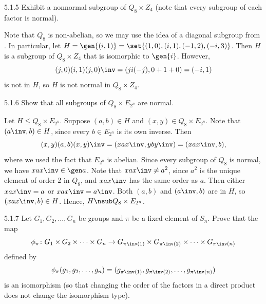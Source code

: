 \begin{exercise}{5.1.5}
    Exhibit a nonnormal subgroup of $Q_8 \times Z_4$ (note that every subgroup of each factor is normal).
\end{exercise}

\begin{sol}
    Note that $Q_8$ is non-abelian, so we may use the idea of a diagonal subgroup from .
	In particular, let $H = \gen{(i, 1)} = \set{(1, 0), (i, 1), (-1, 2), (-i, 3)}$.
	Then $H$ is a subgroup of $Q_8 \times Z_4$ that is isomorphic to $\gen{i}$.
	However,
    \[
    	(j, 0)(i, 1)(j, 0)\inv = (ji(-j), 0 + 1 + 0) = (-i, 1)
    \]
    is not in $H$, so $H$ is not normal in $Q_8 \times Z_4$.
\end{sol}

\begin{exercise}{5.1.6}
    Show that all subgroups of $Q_8 \times E_{2^n}$ are normal.
\end{exercise}

\begin{sol}
    Let $H \leq Q_8 \times E_{2^n}$.
	Suppose $(a, b) \in H$ and $(x, y) \in Q_8 \times E_{2^n}$.
	Note that $(a\inv, b) \in H$, since every $b \in E_{2^n}$ is its own inverse.
	Then
    \[
    	(x, y)(a, b)(x, y)\inv = (xax\inv, yby\inv) = (xax\inv, b),
    \]
    where we used the fact that $E_{2^n}$ is abelian.
	Since every subgroup of $Q_8$ is normal, we have $xax\inv \in \gen a$.
    Note that $xax\inv \neq a^2$, since $a^2$ is the unique element of order 2 in $Q_8$, and $xax\inv$ has the same order as $a$.
    Then either $xax\inv = a$ or $xax\inv = a\inv$.
    Both $(a, b)$ and $(a\inv, b)$ are in $H$, so $(xax\inv, b) \in H$.
    Hence, $H \nsub Q_8 \times E_{2^n}$.
\end{sol}

\begin{exercise}{5.1.7}
    Let $G_1, G_2, \ldots, G_n$ be groups and $\pi$ be a fixed element of $S_n$.
	Prove that the map 
    \[
    	\phi_\pi \colon G_1 \times G_2 \times \cdots \times G_n \to G_{\pi\inv(1)} \times G_{\pi\inv(2)} \times \cdots \times G_{\pi\inv(n)}
    \]
    defined by
    \[
    	\phi_\pi(g_1, g_2, \ldots, g_n) = (g_{\pi\inv(1)}, g_{\pi\inv(2)}, \ldots, g_{\pi\inv(n)})
    \]
    is an isomorphism (so that changing the order of the factors in a direct product does not change the isomorphism type).
\end{exercise}

